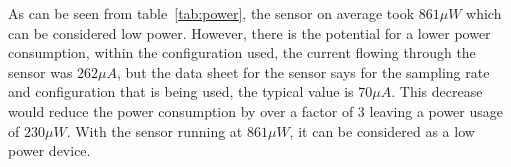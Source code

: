 As can be seen from table~\ref{tab:power}, the sensor on average took $861\mu W$ which can be considered low power. However, there is the potential for a lower power consumption, within the configuration used, the current flowing through the sensor was $262\mu A$, but the data sheet for the sensor says for the sampling rate and configuration that is being used, the typical value is $70\mu A$. This decrease would reduce the power consumption by over a factor of 3 leaving a power usage of $230\mu W$. With the sensor running at $861\mu W$, it can be considered as a low power device.